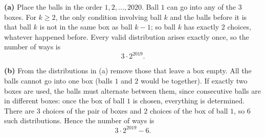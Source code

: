 \textbf{(a)} Place the balls in the order $1,2,\ldots,2020$. Ball $1$ can go into any of the $3$ boxes. For $k\ge2$, the only condition involving ball $k$ and the balls before it is that ball $k$ is not in the same box as ball $k-1$; so ball $k$ has exactly $2$ choices, whatever happened before. Every valid distribution arises exactly once, so the number of ways is
\[\boxed{3\cdot2^{2019}}.\]

\textbf{(b)} From the distributions in (a) remove those that leave a box empty. All the balls cannot go into one box (balls $1$ and $2$ would be together). If exactly two boxes are used, the balls must alternate between them, since consecutive balls are in different boxes: once the box of ball $1$ is chosen, everything is determined. There are $3$ choices of the pair of boxes and $2$ choices of the box of ball $1$, so $6$ such distributions. Hence the number of ways is
\[\boxed{3\cdot2^{2019}-6}.\]
